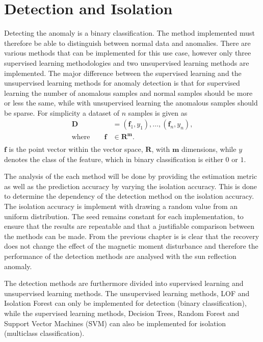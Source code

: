\chapter{Detection and Isolation}
\label{chap:Detection}
Detecting the anomaly is a binary classification. The method implemented must therefore be able to distinguish between normal data and anomalies. There are various methods that can be implemented for this use case, however only three supervised learning methodologies and two unsupervised learning methods are implemented. The major difference between the supervised learning and the unsupervised learning methods for anomaly detection is that for supervised learning the number of anomalous samples and normal samples should be more or less the same, while with unsupervised learning the anomalous samples should be sparse. For simplicity a dataset of $n$ samples is given as 
\begin{equation}
\begin{aligned}
\mathbf{D} &= \left(\mathbf{f}_1, y_1 \right), \ldots , \left(\mathbf{f}_n, y_n \right), \\
\text{where} \qquad \mathbf{f} & \in \mathbf{R^m}. \\
\end{aligned}
\end{equation}
$\mathbf{f}$ is the point vector within the vector space, $\mathbf{R}$, with $\mathbf{m}$ dimensions, while $y$ denotes the class of the feature, which in binary classification is either $0$ or $1$.

The analysis of the each method will be done by providing the estimation metric as well as the prediction accuracy by varying the isolation accuracy. This is done to determine the dependency of the detection method on the isolation accuracy. The isolation accuracy is implement with drawing a random value from an uniform distribution. The seed remains constant for each implementation, to ensure that the results are repeatable and that a justifiable comparison between the methods can be made. From the previous chapter is is clear that the recovery does not change the effect of the magnetic moment disturbance and therefore the performance of the detection methods are analysed with the sun reflection anomaly.

The detection methods are furthermore divided into supervised learning and unsupervised learning methods. The unsupervised learning methods, LOF and Isolation Forest can only be implemented for detection (binary classification), while the supervised learning methods, Decision Trees, Random Forest and Support Vector Machines (SVM) can also be implemented for isolation (multiclass classification).

